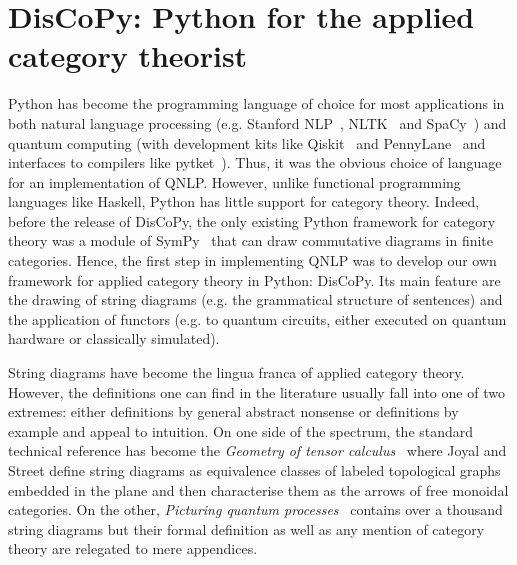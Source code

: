 
\chapter{DisCoPy: Python for the applied category theorist}\label{chapter:discopy}

Python has become the programming language of choice for most applications in both natural language processing (e.g. Stanford NLP~\cite{ManningEtAl14}, NLTK~\cite{LoperBird02} and SpaCy~\cite{HonnibalMontani17}) and quantum computing (with development kits like Qiskit~\cite{Cross18} and PennyLane~\cite{BergholmEtAl20} and interfaces to compilers like pytket~\cite{SivarajahEtAl20}).
Thus, it was the obvious choice of language for an implementation of QNLP.
However, unlike functional programming languages like Haskell, Python has little support for category theory.
Indeed, before the release of DisCoPy, the only existing Python framework for category theory was a module of SymPy~\cite{MeurerEtAl17} that can draw commutative diagrams in finite categories.
Hence, the first step in implementing QNLP was to develop our own framework for applied category theory in Python: DisCoPy.
Its main feature are the drawing of string diagrams (e.g. the grammatical structure of sentences) and the application of functors (e.g. to quantum circuits, either executed on quantum hardware or classically simulated).

String diagrams have become the lingua franca of applied category theory.
However, the definitions one can find in the literature usually fall into one of two extremes: either definitions by general abstract nonsense or definitions by example and appeal to intuition.
On one side of the spectrum, the standard technical reference has become the \emph{Geometry of tensor calculus}~\cite{JoyalStreet91} where Joyal and Street define string diagrams as equivalence classes of labeled topological graphs embedded in the plane and then characterise them as the arrows of free monoidal categories.
On the other, \emph{Picturing quantum processes}~\cite{CoeckeKissinger17} contains over a thousand string diagrams but their formal definition as well as any mention of category theory are relegated to mere appendices.

